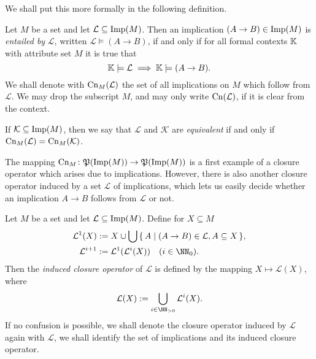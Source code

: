 We shall put this more formally in the following definition.

\begin{Definition}
  \label{def:entailment-between-implications}
  Let $M$ be a set and let $\mathcal{L} \subseteq \operatorname{Imp}(M)$.  Then an implication $(A \to
  B) \in \operatorname{Imp}(M)$ is \emph{entailed by} $\mathcal{L}$, written $\mathcal{L} \models (A \to
  B)$, if and only if for all formal contexts ${\mathbb{K}}$ with attribute set $M$ it is true that
  \begin{equation*}
    {\ensuremath{\mathbb{K}}} \models \mathcal{L} \implies {\ensuremath{\mathbb{K}}} \models (A \to B).
  \end{equation*}
  We shall denote with $\operatorname{Cn}_M(\mathcal{L})$ the set of all implications on $M$ which
  follow from $\mathcal{L}$.  We may drop the subscript $M$, and may only write
  $\operatorname{Cn}(\mathcal{L})$, if it is clear from the context.

  If $\mathcal{K} \subseteq \operatorname{Imp}(M)$, then we say that $\mathcal{L}$ and $\mathcal{K}$ are
  \emph{equivalent} if and only if $\operatorname{Cn}_M(\mathcal{L}) = \operatorname{Cn}_M(\mathcal{K})$.
\end{Definition}

The mapping $\operatorname{Cn}_M \colon {\ensuremath{\mathfrak{P}(\operatorname{Imp}(M))}} \to {\ensuremath{\mathfrak{P}(\operatorname{Imp}(M))}}$ is a first example of a
closure operator which arises due to implications.  However, there is also another closure
operator induced by a set $\mathcal{L}$ of implications, which lets us easily decide
whether an implication $A \to B$ follows from $\mathcal{L}$ or not.

\begin{Definition}
  \label{def:induced-closure-operator}
  Let $M$ be a set and let $\mathcal{L} \subseteq \operatorname{Imp}(M)$.  Define for $X \subseteq M$
  \begin{align*}
    \mathcal{L}^1(X) &:= X \cup \bigcup \set{ A \mid (A \to B) \in \mathcal{L}, A
      \subseteq X }, \\
    \mathcal{L}^{i + 1} &:= \mathcal{L}^1(\mathcal{L}^i(X)) \quad (i \in \NN_0).
  \end{align*}
  Then the \emph{induced closure operator} of $\mathcal{L}$ is defined by the mapping $X
  \mapsto \mathcal{L}(X)$, where
  \begin{equation*}
    \mathcal{L}(X) := \bigcup_{i \in \NN_{>0}}\mathcal{L}^i(X).
  \end{equation*}
  If no confusion is possible, we shall denote the closure operator induced by
  $\mathcal{L}$ again with $\mathcal{L}$, \ie we shall identify the set of implications
  and its induced closure operator.
\end{Definition}

